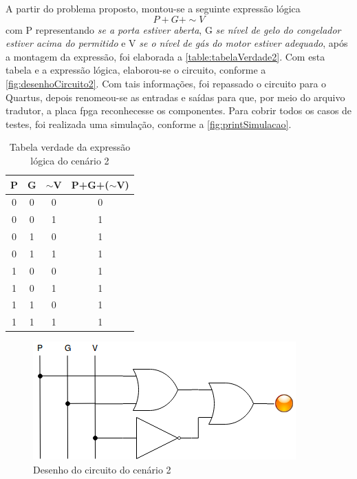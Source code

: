 	A partir do problema proposto, montou-se a seguinte expressão lógica
	$$ P + G + \sim V$$
	com P representando \textit{se a porta estiver aberta}, G
	\textit{se nível de gelo do congelador estiver acima do permitido} e V
	\textit{se o nível de gás do motor estiver adequado}, após a
	montagem da expressão, foi elaborada a \autoref{table:tabelaVerdade2}. Com esta tabela e a expressão lógica,
	elaborou-se o circuito, conforme a \autoref{fig:desenhoCircuito2}. Com tais informações, foi repassado o circuito
	para o Quartus, depois renomeou-se as entradas e saídas para que, por meio do arquivo tradutor, a placa
	\ac{fpga} reconhecesse os componentes.
	Para cobrir todos os casos de testes, foi realizada uma simulação, conforme a \autoref{fig:printSimulacao}.

	\begin{table}[h]
		\centering
		\caption{Tabela verdade da expressão lógica do cenário 2}\label{table:tabelaVerdade2}
		\begin{tabular}{c|c|c|c}
			\textbf{P} & \textbf{G} & \textbf{$\sim$V} & \textbf{P+G+($\sim$V)} \\
			\hline
			0 & 0 & 0 & 0\\\hline
			0 & 0 & 1 & 1\\\hline
			0 & 1 & 0 & 1\\\hline
			0 & 1 & 1 & 1\\\hline
			1 & 0 & 0 & 1\\\hline
			1 & 0 & 1 & 1\\\hline
			1 & 1 & 0 & 1\\\hline
			1 & 1 & 1 & 1
		\end{tabular}
	\end{table}

	\begin{figure}[H]
	    \centering
		\caption{\label{fig:desenhoCircuito2}Desenho do circuito do cenário 2}
		\includegraphics{img/cenario2/desenhoCircuito}
	\end{figure}


